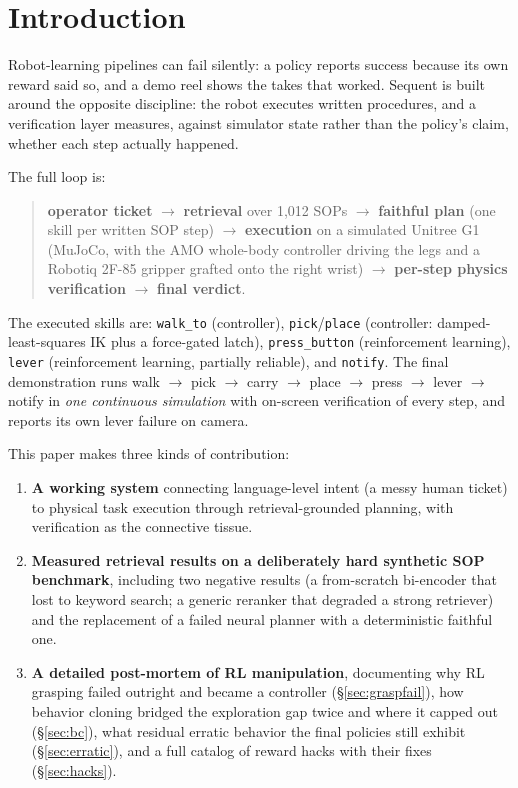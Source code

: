 \documentclass[11pt]{article}
\begin{document}
\section{Introduction}

Robot-learning pipelines can fail silently: a policy reports success because its own reward said so, and a demo reel shows the takes that worked. Sequent is built around the opposite discipline: the robot executes written procedures, and a verification layer measures, against simulator state rather than the policy's claim, whether each step actually happened.

The full loop is:
\begin{quote}
\textbf{operator ticket} $\to$ \textbf{retrieval} over 1{,}012 SOPs $\to$ \textbf{faithful plan} (one skill per written SOP step) $\to$ \textbf{execution} on a simulated Unitree G1 (MuJoCo, with the AMO whole-body controller \cite{amo} driving the legs and a Robotiq 2F-85 gripper grafted onto the right wrist) $\to$ \textbf{per-step physics verification} $\to$ \textbf{final verdict}.
\end{quote}

The executed skills are: \texttt{walk\_to} (controller), \texttt{pick}/\texttt{place} (controller: damped-least-squares IK plus a force-gated latch), \texttt{press\_button} (reinforcement learning), \texttt{lever} (reinforcement learning, partially reliable), and \texttt{notify}. The final demonstration runs walk $\to$ pick $\to$ carry $\to$ place $\to$ press $\to$ lever $\to$ notify in \emph{one continuous simulation} with on-screen verification of every step, and reports its own lever failure on camera.

This paper makes three kinds of contribution:
\begin{enumerate}[nosep]
  \item \textbf{A working system} connecting language-level intent (a messy human ticket) to physical task execution through retrieval-grounded planning, with verification as the connective tissue.
  \item \textbf{Measured retrieval results on a deliberately hard synthetic SOP benchmark}, including two negative results (a from-scratch bi-encoder that lost to keyword search; a generic reranker that degraded a strong retriever) and the replacement of a failed neural planner with a deterministic faithful one.
  \item \textbf{A detailed post-mortem of RL manipulation}, documenting why RL grasping failed outright and became a controller (\S\ref{sec:graspfail}), how behavior cloning bridged the exploration gap twice and where it capped out (\S\ref{sec:bc}), what residual erratic behavior the final policies still exhibit (\S\ref{sec:erratic}), and a full catalog of reward hacks with their fixes (\S\ref{sec:hacks}).
\end{enumerate}
\end{document}
